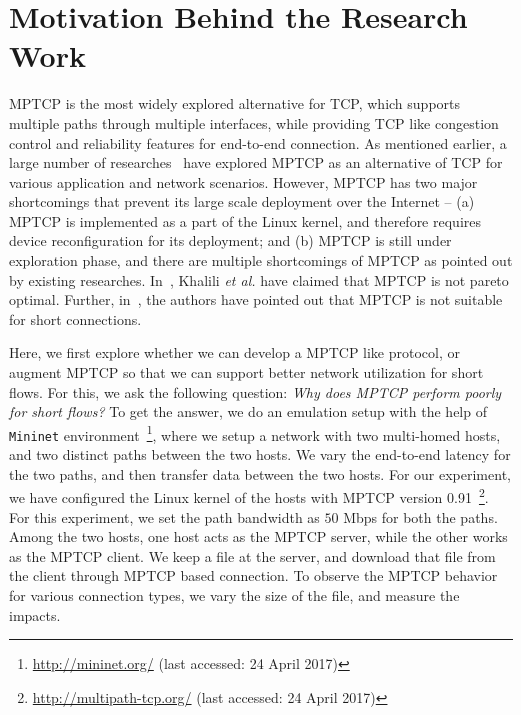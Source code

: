 \section{Motivation Behind the Research Work}

MPTCP is the most widely explored alternative for TCP, which supports multiple paths through multiple interfaces, while providing TCP like congestion control and reliability features for end-to-end connection. As mentioned earlier, a large number of researches~\cite{oh2016feedback,barik2016lisa,khalili2013mptcp,kheirkhah2016mmptcp,kheirkhah2015short} have explored MPTCP as an alternative of TCP for various application and network scenarios. However, MPTCP has two major shortcomings that prevent its large scale deployment over the Internet -- (a) MPTCP is implemented as a part of the Linux kernel, and therefore requires device reconfiguration for its deployment; and (b) MPTCP is still under exploration phase, and there are multiple shortcomings of MPTCP as pointed out by existing researches. In~\cite{khalili2013mptcp}, Khalili \textit{et al.} have claimed that MPTCP is not pareto optimal. Further, in~\cite{kheirkhah2016mmptcp}, the authors have pointed out that MPTCP is not suitable for short connections. 

Here, we first explore whether we can develop a MPTCP like protocol, or augment MPTCP so that we can support better network utilization for short flows. For this, we ask the following question: \textit{Why does MPTCP perform poorly for short flows?}  To get the answer, we do an emulation setup with the help of \texttt{Mininet} environment~\footnote{\url{http://mininet.org/} (last accessed: 24 April 2017)}, where we setup a network with two multi-homed hosts, and two distinct paths between the two hosts. We vary the end-to-end latency for the two paths, and then transfer data between the two hosts. For our experiment, we have configured the Linux kernel of the hosts with MPTCP version 0.91~\footnote{\url{http://multipath-tcp.org/} (last accessed: 24 April 2017)}. For this experiment, we set the path bandwidth as $50$ Mbps for both the paths. Among the two hosts, one host acts as the MPTCP server, while the other works as the MPTCP client. We keep a file at the server, and download that file from the client through MPTCP based connection. To observe the MPTCP behavior for various connection types, we vary the size of the file, and measure the impacts. 
%
%		

